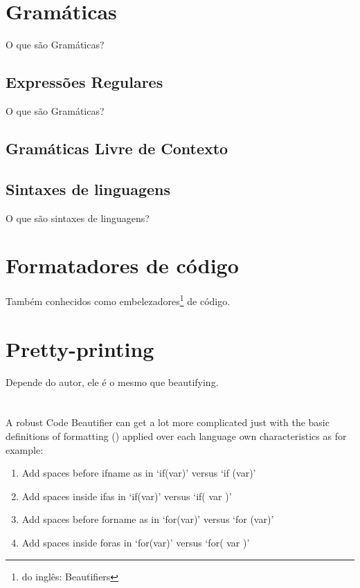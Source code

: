 \section{Gramáticas}

O que são Gramáticas?


\subsection{Expressões Regulares}

O que são Gramáticas?


\subsection{Gramáticas Livre de Contexto}


\subsection{Sintaxes de linguagens}

O que são sintaxes de linguagens?


\section{Formatadores de código}

Também conhecidos como embelezadores\footnote{do inglês:
Beautifiers} de código.


\section{Pretty-printing}

Depende do autor, ele é o mesmo que beautifying.


\section{}

    A robust Code Beautifier can get a lot more complicated just with the basic
    definitions of formatting ()
    applied over each language own characteristics
    as for example:

\begin{enumerate}
    \item
        Add spaces before if\s name as in `if(var)' versus `if (var)'
    \item
        Add spaces inside if\s as in `if(var)' versus `if( var )'
    \item
        Add spaces before for\s name as in `for(var)' versus `for (var)'
    \item
        Add spaces inside for\s as in `for(var)' versus `for( var )'
\end{enumerate}

